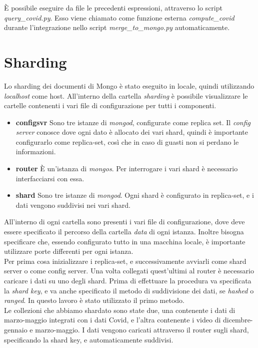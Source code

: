 \documentclass[10pt, a4paper,openany]{article}
\begin{document}
\`E possibile eseguire da file le precedenti espressioni, attraverso lo script \textit{query\_covid.py}. Esso viene chiamato come funzione esterna \textit{compute\_covid} durante l'integrazione nello script \textit{merge\_to\_mongo.py} automaticamente.

\section*{Sharding}

Lo sharding dei documenti di Mongo è stato eseguito in locale, quindi utilizzando \textit{localhost} come host. All'interno della cartella \textit{sharding} è possibile visualizzare le cartelle contenenti i vari file di configurazione per tutti i componenti.

\begin{itemize}
	\item \textbf{configsvr} Sono tre istanze di \textit{mongod}, configurate come replica set. Il \textit{config server} conosce dove ogni dato è allocato dei vari shard, quindi è importante configurarlo come replica-set, così che in caso di guasti non si perdano le informazioni.
	\item \textbf{router} \`E un'istanza di \textit{mongos}. Per interrogare i vari shard è necessario interfacciarsi con essa.
	\item \textbf{shard} Sono tre istanze di \textit{mongod}. Ogni shard è configurato in replica-set, e i dati vengono suddivisi nei vari shard.
\end{itemize}

All'interno di ogni cartella sono presenti i vari file di configurazione, dove deve essere specificato il percorso della cartella \textit{data} di ogni istanza. Inoltre bisogna specificare che, essendo configurato tutto in una macchina locale, è importante utilizzare porte differenti per ogni istanza.
\\
Per prima cosa inizializzare i replica-set, e successivamente avviarli come shard server o come config server. Una volta collegati quest'ultimi al router è necessario caricare i dati su uno degli shard. Prima di effettuare la procedura va specificata la \textit{shard key}, e va anche specificato il metodo di suddivisione dei dati, se \textit{hashed} o \textit{ranged}. In questo lavoro è stato utilizzato il primo metodo.
\\
Le collezioni che abbiamo shardato sono state due, una contenente i dati di marzo-maggio integrati con i dati Covid, e l'altra contenente i video di dicembre-gennaio e marzo-maggio. I dati vengono caricati attraverso il router sugli shard, specificando la shard key, e automaticamente suddivisi.
\end{document}
